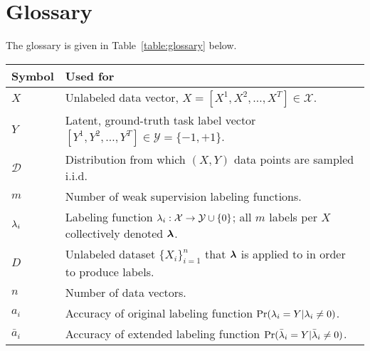 \section{Glossary}
\label{sec:gloss}

The glossary is given in Table~\ref{table:glossary} below.
\begin{table*}[h]
\centering
\small
\begin{tabular}{l l}
\toprule
Symbol & Used for \\
\midrule
$X$ & Unlabeled data vector, $X = [X^1, X^2, \ldots, X^T] \in \mathcal{X}$. \\
$Y$ & Latent, ground-truth task label vector $[Y^1, Y^2, \ldots, Y^T] \in \mathcal{Y} = \{-1, +1\}$.  \\
$\mathcal{D}$ & Distribution from which $(X, Y)$ data points are sampled i.i.d. \\
$m$ & Number of weak supervision labeling functions. \\
$\lambda_i$ & Labeling function $\lambda_i: \mathcal{X} \rightarrow \mathcal{Y} \cup \{0\}$; all $m$ labels per $X$ collectively denoted $\bm{\lambda}$. \\
$D$ & Unlabeled dataset $\{X_i\}_{i = 1}^n$ that $\bm{\lambda}$ is applied to in order to produce labels. \\
$n$ & Number of data vectors. \\
$a_i$ & Accuracy of original labeling function $\Pr(\lambda_i = Y | \lambda_i \neq 0)$. \\
$\bar{a}_i$ & Accuracy of extended labeling function $\Pr(\bar{\lambda}_i = Y | \bar{\lambda}_i \neq 0)$. \\
\toprule
\end{tabular}
\caption{
	Glossary of variables and symbols used in this paper.
}
\label{table:glossary}
\end{table*}


